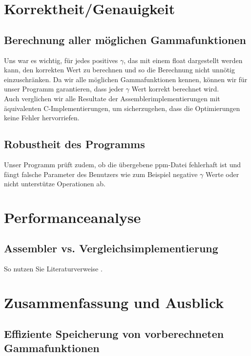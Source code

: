 \documentclass[course=erap]{aspdoc}
\begin{document}
\section{Korrektheit/Genauigkeit}
\subsection{Berechnung aller möglichen Gammafunktionen}
Uns war es wichtig, für jedes positives $\gamma$, das mit einem float dargestellt werden kann, den korrekten Wert zu berechnen und so die Berechnung nicht unnötig einzuschränken. Da wir alle möglichen Gammafunktionen kennen, können wir für unser Programm garantieren, dass jeder $\gamma$ Wert korrekt berechnet wird. 
\\
Auch verglichen wir alle Resultate der Assemblerimplementierungen mit äquivalenten C-Implementierungen, um sicherzugehen, dass die Optimierungen keine Fehler hervorriefen.  
\subsection{Robustheit des Programms}
Unser Programm prüft zudem, ob die übergebene ppm-Datei fehlerhaft ist und fängt falsche Parameter des Benutzers wie zum Beispiel negative $\gamma$ Werte oder nicht unterstütze Operationen ab. 

\section{Performanceanalyse}
\subsection{Assembler vs. Vergleichsimplementierung}
So nutzen Sie Literaturverweise \cite{aristotle:physics}. 


\section{Zusammenfassung und Ausblick}
\subsection{Effiziente Speicherung von vorberechneten Gammafunktionen}


{}
\printbibliography
\end{document}
